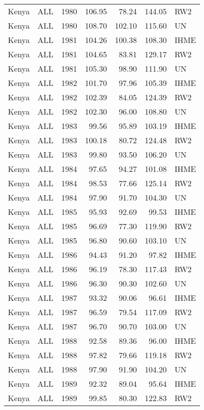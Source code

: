 \begin{longtable}{lllrrrl}
  Kenya & ALL & 1980 & 106.95 & 78.24 & 144.05 & RW2 \\ 
  Kenya & ALL & 1980 & 108.70 & 102.10 & 115.60 & UN \\ 
  Kenya & ALL & 1981 & 104.26 & 100.38 & 108.30 & IHME \\ 
  Kenya & ALL & 1981 & 104.65 & 83.81 & 129.17 & RW2 \\ 
  Kenya & ALL & 1981 & 105.30 & 98.90 & 111.90 & UN \\ 
  Kenya & ALL & 1982 & 101.70 & 97.96 & 105.39 & IHME \\ 
  Kenya & ALL & 1982 & 102.39 & 84.05 & 124.39 & RW2 \\ 
  Kenya & ALL & 1982 & 102.30 & 96.00 & 108.80 & UN \\ 
  Kenya & ALL & 1983 & 99.56 & 95.89 & 103.19 & IHME \\ 
  Kenya & ALL & 1983 & 100.18 & 80.72 & 124.48 & RW2 \\ 
  Kenya & ALL & 1983 & 99.80 & 93.50 & 106.20 & UN \\ 
  Kenya & ALL & 1984 & 97.65 & 94.27 & 101.08 & IHME \\ 
  Kenya & ALL & 1984 & 98.53 & 77.66 & 125.14 & RW2 \\ 
  Kenya & ALL & 1984 & 97.90 & 91.70 & 104.30 & UN \\ 
  Kenya & ALL & 1985 & 95.93 & 92.69 & 99.53 & IHME \\ 
  Kenya & ALL & 1985 & 96.69 & 77.30 & 119.90 & RW2 \\ 
  Kenya & ALL & 1985 & 96.80 & 90.60 & 103.10 & UN \\ 
  Kenya & ALL & 1986 & 94.43 & 91.20 & 97.82 & IHME \\ 
  Kenya & ALL & 1986 & 96.19 & 78.30 & 117.43 & RW2 \\ 
  Kenya & ALL & 1986 & 96.30 & 90.30 & 102.60 & UN \\ 
  Kenya & ALL & 1987 & 93.32 & 90.06 & 96.61 & IHME \\ 
  Kenya & ALL & 1987 & 96.59 & 79.54 & 117.09 & RW2 \\ 
  Kenya & ALL & 1987 & 96.70 & 90.70 & 103.00 & UN \\ 
  Kenya & ALL & 1988 & 92.58 & 89.36 & 96.00 & IHME \\ 
  Kenya & ALL & 1988 & 97.82 & 79.66 & 119.18 & RW2 \\ 
  Kenya & ALL & 1988 & 97.90 & 91.90 & 104.20 & UN \\ 
  Kenya & ALL & 1989 & 92.32 & 89.04 & 95.64 & IHME \\ 
  Kenya & ALL & 1989 & 99.85 & 80.30 & 122.83 & RW2 \\ 

\end{longtable}
